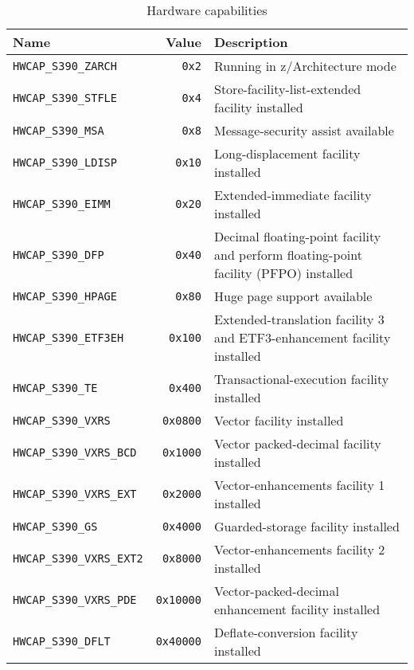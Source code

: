 \documentclass[english,11pt,twoside,toc=bib,toc=idx]{scrreprt}
\newenvironment{DIFnomarkup}{}{} %
\begin{document}
\begin{table}
  \centering
  \begin{DIFnomarkup}
  \begin{tabularx}{\textwidth}{lr>{\raggedright\arraybackslash}X}
    \toprule
    Name & Value & Description \\
    \midrule
    \texttt{HWCAP\_S390\_ZARCH} & \texttt{0x2}
    & Running in z/Architecture mode \\
    \texttt{HWCAP\_S390\_STFLE} & \texttt{0x4}
    & Store-facility-list-extended facility installed \\
    \texttt{HWCAP\_S390\_MSA} & \texttt{0x8}
    & Message-security assist available \\
    \texttt{HWCAP\_S390\_LDISP} & \texttt{0x10}
    & Long-displacement facility installed \\
    \texttt{HWCAP\_S390\_EIMM} & \texttt{0x20}
    & Extended-immediate facility installed \\
    \texttt{HWCAP\_S390\_DFP} & \texttt{0x40}
    & Decimal floating-point facility and perform floating-point
    facility (PFPO) installed \\
    \texttt{HWCAP\_S390\_HPAGE} & \texttt{0x80}
    & Huge page support available \\
    \texttt{HWCAP\_S390\_ETF3EH} & \texttt{0x100}
    & Extended-translation facility 3 and ETF3-enhancement
    facility installed \\
    \texttt{HWCAP\_S390\_TE} & \texttt{0x400}
    & Transactional-execution facility installed \\
    \texttt{HWCAP\_S390\_VXRS} & \texttt{0x0800}
    & Vector facility installed \\
    \texttt{HWCAP\_S390\_VXRS\_BCD} & \texttt{0x1000}
    & Vector packed-decimal facility installed \\
    \texttt{HWCAP\_S390\_VXRS\_EXT} & \texttt{0x2000}
    & Vector-enhancements facility 1 installed \\
    \texttt{HWCAP\_S390\_GS} & \texttt{0x4000}
    & Guarded-storage facility installed \\
    \texttt{HWCAP\_S390\_VXRS\_EXT2} & \texttt{0x8000}
    & Vector-enhancements facility 2 installed \\
    \texttt{HWCAP\_S390\_VXRS\_PDE} & \texttt{0x10000}
    & Vector-packed-decimal enhancement facility installed \\
    \texttt{HWCAP\_S390\_DFLT} & \texttt{0x40000}
    & Deflate-conversion facility installed \\
    \bottomrule
  \end{tabularx}
  \end{DIFnomarkup}
  \caption{Hardware capabilities}
  \label{tab:hwcap}
\end{table}
\end{document}
